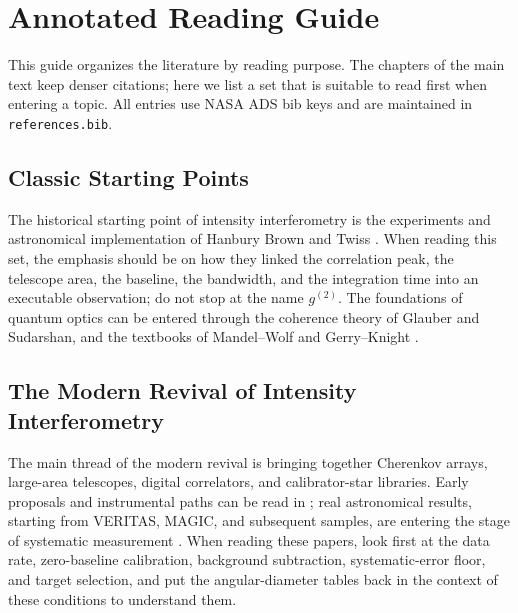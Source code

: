 \chapter{Annotated Reading Guide}
\label{app:g}

This guide organizes the literature by reading purpose. The chapters of the main text keep denser citations; here we list a set that is suitable to read first when entering a topic. All entries use NASA ADS bib keys and are maintained in \texttt{references.bib}.

\section{Classic Starting Points}
\label{appsec:g-classic}

The historical starting point of intensity interferometry is the experiments and astronomical implementation of Hanbury Brown and Twiss \citep{1956Natur.178.1046H,1957RSPSA.242..300B,1974iiia.book.....H}. When reading this set, the emphasis should be on how they linked the correlation peak, the telescope area, the baseline, the bandwidth, and the integration time into an executable observation; do not stop at the name \(g^{(2)}\). The foundations of quantum optics can be entered through the coherence theory of Glauber and Sudarshan, and the textbooks of Mandel--Wolf and Gerry--Knight \citep{1963PhRv..130.2529G,1963PhRvL..10..277S,1995ocqo.book.....M,1985stop.book.....G}.

\section{The Modern Revival of Intensity Interferometry}
\label{appsec:g-sii}

The main thread of the modern revival is bringing together Cherenkov arrays, large-area telescopes, digital correlators, and calibrator-star libraries. Early proposals and instrumental paths can be read in \citet{2009A&A...508..531N,2017MNRAS.472.4126G}; real astronomical results, starting from VERITAS, MAGIC, and subsequent samples, are entering the stage of systematic measurement \citep{2020NatAs...4.1164A,2021MNRAS.506.1585Z,2022MNRAS.512.1722K,2024MNRAS.529.4387A,2024ApJ...966...28A,2025ApJ...995..191A}. When reading these papers, look first at the data rate, zero-baseline calibration, background subtraction, systematic-error floor, and target selection, and put the angular-diameter tables back in the context of these conditions to understand them.

